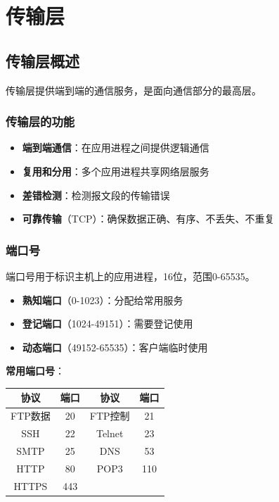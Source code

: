 \chapter{传输层}
\section{传输层概述}
传输层提供端到端的通信服务，是面向通信部分的最高层。

\subsection{传输层的功能}
\begin{itemize}[leftmargin=2em,itemsep=0pt]
    \item \textbf{端到端通信}：在应用进程之间提供逻辑通信
    \item \textbf{复用和分用}：多个应用进程共享网络层服务
    \item \textbf{差错检测}：检测报文段的传输错误
    \item \textbf{可靠传输}（TCP）：确保数据正确、有序、不丢失、不重复
\end{itemize}

\subsection{端口号}
端口号用于标识主机上的应用进程，16位，范围0-65535。

\begin{itemize}[leftmargin=2em,itemsep=0pt]
    \item \textbf{熟知端口}（0-1023）：分配给常用服务
    \item \textbf{登记端口}（1024-49151）：需要登记使用
    \item \textbf{动态端口}（49152-65535）：客户端临时使用
\end{itemize}

\textbf{常用端口号}：
\begin{table}[htbp]
\centering\small
\begin{tabular}{cccc}
\toprule
\textbf{协议} & \textbf{端口} & \textbf{协议} & \textbf{端口} \\
\midrule
FTP数据 & 20 & FTP控制 & 21 \\
SSH & 22 & Telnet & 23 \\
SMTP & 25 & DNS & 53 \\
HTTP & 80 & POP3 & 110 \\
HTTPS & 443 & & \\
\bottomrule
\end{tabular}
\end{table}


